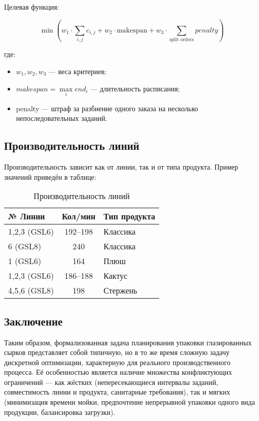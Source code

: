 Целевая функция:

\begin{equation}
    \min \left( w_1 \cdot \sum_{i,j} c_{i,j} + w_2 \cdot \text{makespan} + w_3 \cdot \sum_{\text{split orders}} penalty \right)
    \label{eq:target_function}
\end{equation}

\noindent где:
\begin{itemize}
    \item $w_1, w_2, w_3$ — веса критериев;
    \item $makespan = \max \limits_i end_i$ — длительность расписания;
    \item penalty — штраф за разбиение одного заказа на несколько непоследовательных заданий.
\end{itemize}

\subsection{Производительность линий}

Производительность зависит как от линии, так и от типа продукта. Пример значений приведён в таблице:

\begin{table}[h]
\centering
\caption{Производительность линий}
\begin{tabularx}{\textwidth}{|l|c|X|}
\hline
\textbf{№ Линии} & \textbf{Кол/мин} & \textbf{Тип продукта} \\
\hline
1,2,3 (GSL6) & 192–198 & Классика \\
\hline
6 (GSL8)     & 240     & Классика \\
\hline
1 (GSL6)     & 164     & Плюш \\
\hline
1,2,3 (GSL6) & 186–188 & Кактус \\
\hline
4,5,6 (GSL8) & 198     & Стержень \\
\hline
\end{tabularx}
\end{table}

\subsection{Заключение}

Таким образом, формализованная задача планирования упаковки глазированных сырков представляет собой типичную, но в то же время сложную задачу дискретной оптимизации, характерную для реального производственного процесса. Её особенностью является наличие множества конфликтующих ограничений — как жёстких (непересекающиеся интервалы заданий, совместимость линии и продукта, санитарные требования), так и мягких (минимизация времени мойки, предпочтение непрерывной упаковки одного вида продукции, балансировка загрузки).

